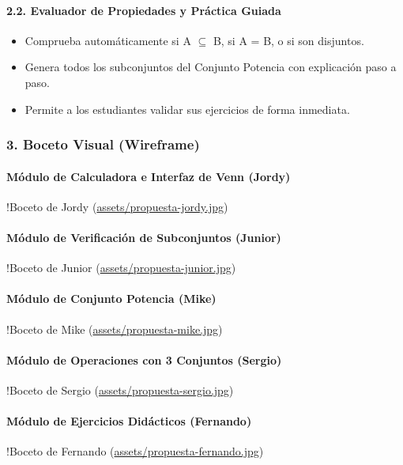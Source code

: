\documentclass[11pt,a4paper,openany]{book}
\begin{document}
\paragraph{2.2. Evaluador de Propiedades y Práctica Guiada}
\begin{itemize}[leftmargin=*]
\item Comprueba automáticamente si A $ \subseteq $ B, si A = B, o si son disjuntos.
\item Genera todos los subconjuntos del Conjunto Potencia con explicación paso a paso.
\item Permite a los estudiantes validar sus ejercicios de forma inmediata.
\end{itemize}

\hrulefill

\subsubsection{3. Boceto Visual (Wireframe)}

\paragraph{Módulo de Calculadora e Interfaz de Venn (Jordy)}
!Boceto de Jordy (\url{assets/propuesta-jordy.jpg})

\paragraph{Módulo de Verificación de Subconjuntos (Junior)}
!Boceto de Junior (\url{assets/propuesta-junior.jpg})

\paragraph{Módulo de Conjunto Potencia (Mike)}
!Boceto de Mike (\url{assets/propuesta-mike.jpg})

\paragraph{Módulo de Operaciones con 3 Conjuntos (Sergio)}
!Boceto de Sergio (\url{assets/propuesta-sergio.jpg})

\paragraph{Módulo de Ejercicios Didácticos (Fernando)}
!Boceto de Fernando (\url{assets/propuesta-fernando.jpg})
\end{document}
